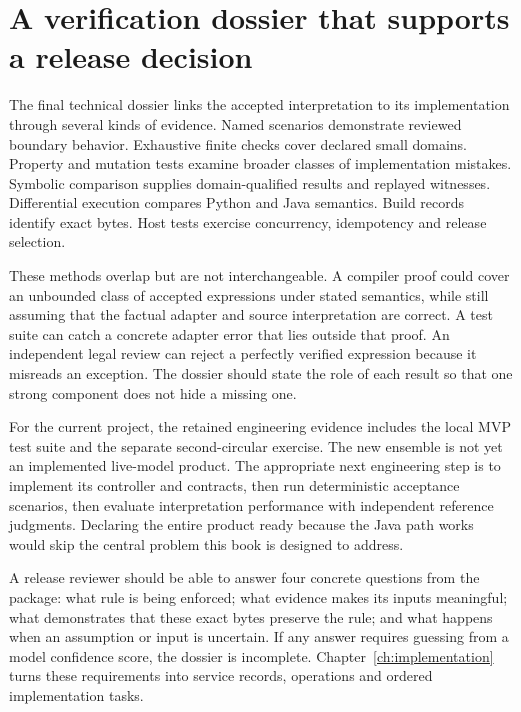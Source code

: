 \section{A verification dossier that supports a release decision}

The final technical dossier links the accepted interpretation to its implementation
through several kinds of evidence. Named scenarios demonstrate reviewed boundary
behavior. Exhaustive finite checks cover declared small domains. Property and
mutation tests examine broader classes of implementation mistakes. Symbolic
comparison supplies domain-qualified results and replayed witnesses. Differential
execution compares Python and Java semantics. Build records identify exact bytes.
Host tests exercise concurrency, idempotency and release selection.

These methods overlap but are not interchangeable. A compiler proof could cover
an unbounded class of accepted expressions under stated semantics, while still
assuming that the factual adapter and source interpretation are correct. A test
suite can catch a concrete adapter error that lies outside that proof. An
independent legal review can reject a perfectly verified expression because it
misreads an exception. The dossier should state the role of each result so that
one strong component does not hide a missing one.

For the current project, the retained engineering evidence includes the local
MVP test suite and the separate second-circular exercise. The new ensemble is not
yet an implemented live-model product. The appropriate next engineering step is
to implement its controller and contracts, then run deterministic acceptance
scenarios, then evaluate interpretation performance with independent reference
judgments. Declaring the entire product ready because the Java path works would
skip the central problem this book is designed to address.

A release reviewer should be able to answer four concrete questions from the
package: what rule is being enforced; what evidence makes its inputs meaningful;
what demonstrates that these exact bytes preserve the rule; and what happens when
an assumption or input is uncertain. If any answer requires guessing from a model
confidence score, the dossier is incomplete. Chapter~\ref{ch:implementation} turns
these requirements into service records, operations and ordered implementation
tasks.
